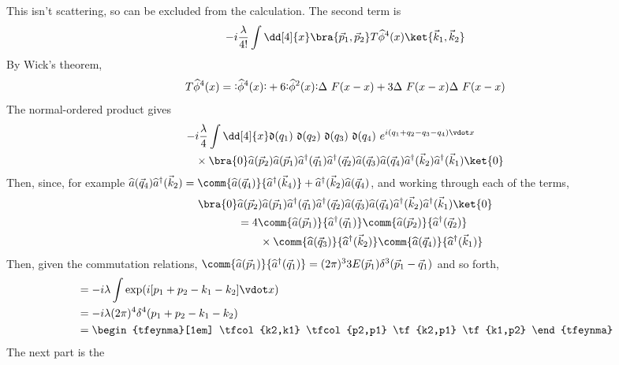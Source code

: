 This isn't scattering, so can be excluded from the calculation.
The second term is
\[ -i \frac{\lambda}{4!} \int \dd[4]{x} \bra{\vec{p}_1,\vec{p}_2} T \Op{\phi}^4(x) \ket{\vec{k}_1, \vec{k}_2} \]
By Wick's theorem,{\small
\[ T \Op{\phi}^4(x) =  \normbracket{\Op{\phi}^4(x)} + 6 \normbracket{\Op{\phi}^2(x)} \Delta~F(x-x) + 3 \Delta~F(x-x) \Delta~F(x-x)\]
}
The normal-ordered product gives
\begin{align*} -& i \frac{\lambda}{4} \int \dd[4]{x} \nm{q_1} \nm{q_2} \nm{q_3} \nm{q_4}  e^{i (q_1+q_2-q_3-q_4) \vdot x}\\
& \times \bra{0} \Op{a}(\vec{p}_2) \Op{a}(\vec{p}_1) \hOp{a}(\vec{q}_1) \hOp{a}(\vec{q}_2) \Op{a}(\vec{q}_3) \Op{a}(\vec{q}_4) \hOp{a}(\vec{k}_2) \hOp{a}(\vec{k}_1) \ket{0}
\end{align*}
Then, since, for example $\Op{a}(\vec{q}_4) \hOp{a}(\vec{k}_2) =
\comm{\Op{a}(\vec{q}_4)}{\hOp{a}(\vec{k}_4)} + \hOp{a}(\vec{k}_2) \Op{a}(\vec{q}_4)$, and working through
each of the terms,
 \begin{align*}
    \bra{0} & \Op{a}(\vec{p}_2) \Op{a}(\vec{p}_1) \hOp{a}(\vec{q}_1) \hOp{a}(\vec{q}_2) \Op{a}(\vec{q}_3) \Op{a}(\vec{q}_4) \hOp{a}(\vec{k}_2) \hOp{a}(\vec{k}_1) \ket{0} \\
 &= 4 \comm{\Op{a}(\vec{p}_1)}{\hOp{a}(\vec{q}_1)} \comm{\Op{a}(\vec{p}_2)}{\hOp{a}(\vec{q}_2)} \\ &\qquad\times\comm{\Op{a}(\vec{q}_3)}{\hOp{a}(\vec{k}_2)} \comm{\Op{a}(\vec{q}_4)}{\hOp{a}(\vec{k}_1)}
 \end{align*}
 Then, given the commutation relations, $
 \comm{\Op{a}(\vec{p}_1)}{\hOp{a}(\vec{q}_1)} = (2 \pi)^3 3
 E(\vec{p}_1) \delta^3(\vec{p}_1 - \vec{q}_1)$ and so forth, 
 \begin{align*}
   &= - i \lambda \int  \exp(i [p_1+p_2-k_1-k_2] \vdot x ) \\
&= - i \lambda  (2 \pi)^4 \delta^4(p_1 + p_2 - k_1 - k_2) \\
&=
\begin{tfeynma}[1em]
  \tfcol{k2,k1} \tfcol{p2,p1} \tf{k2,p1} \tf{k1,p2}
\end{tfeynma}
 \end{align*}
 The next part is the
